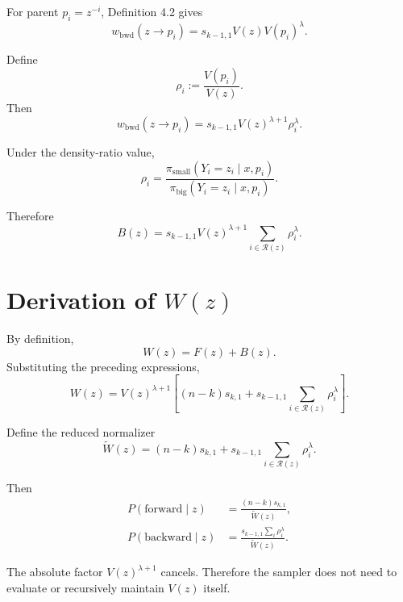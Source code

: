 \documentclass[11pt]{article}
\newcommand{\pb}{\pi_{\mathrm{big}}}
\newcommand{\ps}{\pi_{\mathrm{small}}}
\newcommand{\R}{\mathcal{R}}
\begin{document}
For parent $p_i=z^{-i}$, Definition 4.2 gives
\begin{equation}
w_{\mathrm{bwd}}(z\to p_i)
=
 s_{k-1,1}
 V(z)
 V(p_i)^\lambda.
\end{equation}

Define
\begin{equation}
\rho_i
:=
\frac{V(p_i)}{V(z)}.
\end{equation}
Then
\begin{equation}
w_{\mathrm{bwd}}(z\to p_i)
=
 s_{k-1,1}
 V(z)^{\lambda+1}
 \rho_i^\lambda.
\end{equation}

Under the density-ratio value,
\begin{equation}
\boxed{
\rho_i
=
\frac{\ps(Y_i=z_i\mid x,p_i)}{\pb(Y_i=z_i\mid x,p_i)}.
}
\end{equation}

Therefore
\begin{equation}
\boxed{
B(z)
=
 s_{k-1,1}
 V(z)^{\lambda+1}
 \sum_{i\in\R(z)}\rho_i^\lambda.
}
\end{equation}

\section{Derivation of \texorpdfstring{$W(z)$}{W(z)}}

By definition,
\begin{equation}
W(z)=F(z)+B(z).
\end{equation}
Substituting the preceding expressions,
\begin{equation}
\boxed{
W(z)
=
V(z)^{\lambda+1}
\left[
(n-k)s_{k,1}
+
 s_{k-1,1}
\sum_{i\in\R(z)}\rho_i^\lambda
\right].
}
\end{equation}

Define the reduced normalizer
\begin{equation}
\boxed{
\widetilde W(z)
=
(n-k)s_{k,1}
+
 s_{k-1,1}
\sum_{i\in\R(z)}\rho_i^\lambda.
}
\end{equation}

Then
\begin{align}
P(\text{forward}\mid z)
&=
\frac{(n-k)s_{k,1}}{\widetilde W(z)},\\
P(\text{backward}\mid z)
&=
\frac{s_{k-1,1}\sum_i\rho_i^\lambda}{\widetilde W(z)}.
\end{align}

The absolute factor $V(z)^{\lambda+1}$ cancels. Therefore the sampler does not need to evaluate or recursively maintain $V(z)$ itself.
\end{document}
